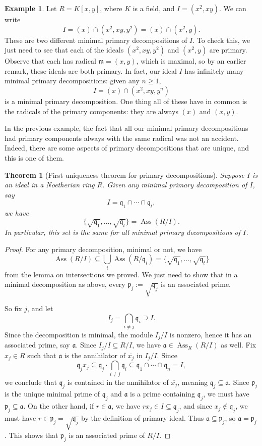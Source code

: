 \documentclass{amsart}[12pt]
\def\Ass{\operatorname{Ass}}
\newcommand{\p}{{\mathfrak p}}
\newcommand{\fm}{{\mathfrak m}}
\newcommand{\q}{{\mathfrak q}}
\numberwithin{equation}{section}
\theoremstyle{plain} %
\newtheorem{theorem}[equation]{Theorem}
\theoremstyle{definition}
\newtheorem{example}[equation]{Example}
\theoremstyle{remark}
\begin{document}
\begin{example}
	Let $R=K[x,y]$, where $K$ is a field, and $I=(x^2,xy)$. We can write
	\[ I = (x) \cap (x^2,xy,y^2) = (x) \cap (x^2,y). \]
	These are two different minimal primary decompositions of $I$. To check this, we just need to see that each of the ideals $(x^2,xy,y^2)$ and $(x^2,y)$ are primary. Observe that each has radical $\fm=(x,y)$, which is maximal, so by an earlier remark, these ideals are both primary. In fact, our ideal $I$ has infinitely many minimal primary decompositions: given any $n \geqslant 1$, 
	$$I = (x) \cap (x^2, xy, y^n)$$ 
	is a minimal primary decomposition. One thing all of these have in common is the radicals of the primary components: they are always $(x)$ and $(x,y)$.
\end{example}


In the previous example, the fact that all our minimal primary decompositions had primary components always with the same radical was not an accident. Indeed, there are some aspects of primary decompositions that are unique, and this is one of them.



\begin{theorem}[First uniqueness theorem for primary decompositions]\label{uniqueness primary decomposition associated primes}
	Suppose $I$ is an ideal in a Noetherian ring $R$. Given any minimal primary decomposition of $I$, say 
	$$I = \q_1 \cap \cdots \cap \q_t,$$ 
	we have 
	$$\{ \sqrt{\q_1},\dots,\sqrt{\q_t}\}=\Ass(R/I).$$ 
	In particular, this set is the same for all minimal primary decompositions of $I$.
\end{theorem}

\begin{proof}
	For any primary decomposition, minimal or not, we have 
	$$\Ass(R/I) \subseteq \bigcup_i \Ass(R/\q_i) = \{ \sqrt{\q_1},\dots,\sqrt{\q_t}\}$$ 
	from the lemma on intersections we proved. We just need to show that in a minimal decomposition as above, every $\p_j  := \sqrt{\q_j}$ is an associated prime.
	
	So fix $j$, and let 
	$$I_j = \displaystyle\bigcap_{i\neq j} \q_i \supseteq I.$$
	Since the decomposition is minimal, the module $I_j/I$ is nonzero, hence it has an associated prime, say $\mathfrak{a}$. Since $I_j / I \subseteq R/I$, we have $\mathfrak{a} \in \Ass_R(R/I)$ as well. Fix $x_j\in R$ such that $\mathfrak{a}$ is the annihilator of $\overline{x_j}$ in $I_j/I$. Since 
	$$\q_j x_j \subseteq \q_j \cdot \displaystyle\bigcap_{i\neq j} \q_i \subseteq \q_1 \cap \cdots \cap \q_n = I,$$ 
	we conclude that $\q_j$ is contained in the annihilator of $\overline{x_j}$, meaning $\q_j \subseteq \mathfrak{a}$. Since $\p_j$ is the unique minimal prime of $\q_j$ and $\mathfrak{a}$ is a prime containing $\q_j$, we must have $\p_j \subseteq \mathfrak{a}$. On the other hand, if $r\in \mathfrak{a}$, we have $rx_j\in I \subseteq \q_j$, and since $x_j\notin \q_j$, we must have $r\in \p_j = \sqrt{\q_j}$ by the definition of primary ideal. Thus $\mathfrak{a} \subseteq \p_j$, so $\mathfrak{a} = \p_j$. This shows that $\p_j$ is an associated prime of $R/I$.
\end{proof}
\end{document}
